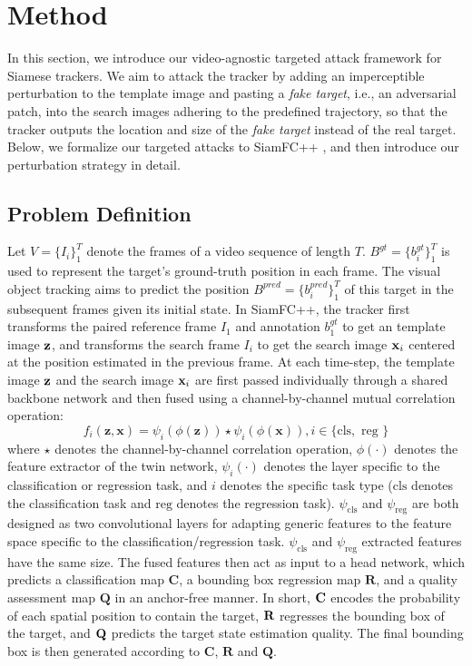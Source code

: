 \documentclass[journal]{IEEEtran}
\begin{document}
\section{Method}

In this section, we introduce our video-agnostic targeted attack framework for Siamese trackers. We aim to attack the tracker by adding an imperceptible perturbation to the template image and pasting a \textit{fake target}, i.e., an adversarial patch, into the search images adhering to the predefined trajectory, so that the tracker outputs the location and size of the \textit{fake target} instead of the real target. Below, we formalize our targeted attacks to SiamFC++ \cite{SiamFC++}, and then introduce our perturbation strategy in detail.
 
\subsection{Problem Definition}

Let $V=\{I_i\}_1^T$ denote the frames of a video sequence of length $T$. $B^{gt}=\{b^{gt}_i\}_1^T$ is used to represent the target's ground-truth position in each frame. The visual object tracking aims to predict the position $B^{pred}=\{b^{pred}_i\}_1^T$ of this target in the subsequent frames given its initial state. In SiamFC++, the tracker first transforms the paired reference frame $I_1$ and annotation $b_1^{gt}$ to get an template image $\textbf z$, and transforms the search frame $I_i$ to get the search image $\textbf x_i$ centered at the position estimated in the previous frame. At each time-step, the template image $\textbf z$ and the search image $\textbf x_i$ are first passed individually through a shared backbone network and then fused using a channel-by-channel mutual correlation operation:
\begin{equation}
  f_{i}(\mathbf{z}, \mathbf{x})=\psi_{i}(\phi(\mathbf{z})) \star \psi_{i}(\phi(\mathbf{x})), i \in\{\mathrm{cls}, \text { reg }\}
\end{equation}
where $\star$ denotes the channel-by-channel correlation operation, $\phi(\cdot)$ denotes the feature extractor of the twin network, $\psi_i(\cdot)$ denotes the layer specific to the classification or regression task, and $i$ denotes the specific task type ($\mathrm{cls}$ denotes the classification task and $\mathrm{reg}$ denotes the regression task). $\psi_{\mathrm{cls}}$ and $\psi_{\mathrm{reg}}$ are both designed as two convolutional layers for adapting generic features to the feature space specific to the classification/regression task. $\psi_{\mathrm{cls}}$ and $\psi_{\mathrm{reg}}$ extracted features have the same size. The fused features then act as input to a head network, which predicts a classification map $\textbf{C}$, a bounding box regression map $\textbf{R}$, and a quality assessment map $\textbf{Q}$ in an anchor-free manner. In short, $\textbf C$ encodes the probability of each spatial position to contain the target, $\textbf R$ regresses the bounding box of the target, and $\textbf Q$ predicts the target state estimation quality. The final bounding box is then generated according to $\textbf{C}$, $\textbf{R}$ and $\textbf{Q}$.
\end{document}
